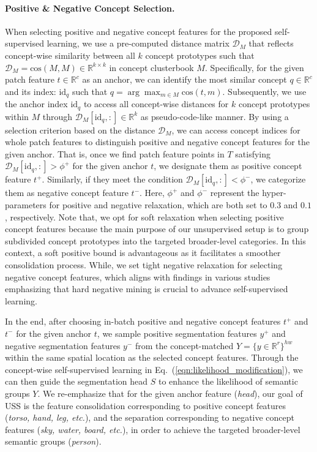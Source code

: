 \documentclass{article} \usepackage{iclr2024_conference,times}
\begin{document}
\paragraph{Positive \& Negative Concept Selection.}
\label{sec:posneg}
When selecting positive and negative concept features for the proposed self-supervised learning, we use a pre-computed distance matrix $\mathcal{D}_M$ that reflects concept-wise similarity between all $k$ concept prototypes such that $\mathcal{D}_M=\text{cos}(M, M)\in\mathbb{R}^{k\times k}$ in concept clusterbook $M$. Specifically, for the given patch feature $t\in\mathbb{R}^{c}$ as an anchor, we can identify the most similar concept $q\in\mathbb{R}^{c}$ and its index: $\text{id}_{q}$ such that $q=\arg\max_{m\in M} \text{cos}(t, m)$. Subsequently, we use the anchor index $\text{id}_{q}$ to access all concept-wise distances for $k$ concept prototypes within $M$ through $\mathcal{D}_{M}[\text{id}_{q}, :]\in\mathbb{R}^{k}$ as pseudo-code-like manner. By using a selection criterion based on the distance $\mathcal{D}_{M}$, we can access concept indices for whole patch features to distinguish positive and negative concept features for the given anchor. That is, once we find patch feature points in $T$ satisfying $\mathcal{D}_M[\text{id}_q, :]>\phi^{+}$ for the given anchor $t$, we designate them as positive concept feature $t^{+}$. Similarly, if they meet the condition $\mathcal{D}_M[\text{id}_q, :]<\phi^{-}$, we categorize them as negative concept feature $t^{-}$. Here, $\phi^{+}$ and $\phi^{-}$ represent the hyper-parameters for positive and negative relaxation, which are both set to $0.3$ and $0.1$, respectively. Note that, we opt for soft relaxation when selecting positive concept features because the main purpose of our unsupervised setup is to group subdivided concept prototypes into the targeted broader-level categories. In this context, a soft positive bound is advantageous as it facilitates a smoother consolidation process. While, we set tight negative relaxation for selecting negative concept features, which aligns with findings in various studies~\citep{khosla2020supervised, kalantidis2020hard, robinson2021contrastive, wang2021exploring} emphasizing that hard negative mining is crucial to advance self-supervised learning.

In the end, after choosing in-batch positive and negative concept features $t^{+}$ and $t^{-}$ for the given anchor $t$, we sample positive segmentation features $y^{+}$ and negative segmentation features $y^{-}$ from the concept-matched $Y=\{y\in\mathbb{R}^{r}\}^{hw}$ within the same spatial location as the selected concept features. Through the concept-wise self-supervised learning in Eq.~(\ref{eqn:likelihood_modification}), we can then guide the segmentation head $S$ to enhance the likelihood of semantic groups $Y$. We re-emphasize that for the given anchor feature (\textit{head}), our goal of USS is the feature consolidation corresponding to positive concept features (\textit{torso, hand, leg, etc.}), and the separation corresponding to negative concept features (\textit{sky, water, board, etc.}), in order to achieve the targeted broader-level semantic groups (\textit{person}).
\end{document}

